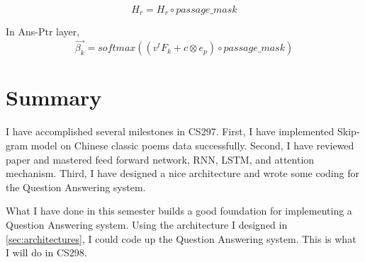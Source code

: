 \documentclass[12pt]{article}
\begin{document}
$$H_r = H_r \circ passage\_mask$$

In Ans-Ptr layer,
$$\overrightarrow{\beta _k} = softmax( (v^tF_k + c \otimes e_p) \circ passage\_mask)$$

\break

\section{Summary}\label{sec:summary}

I have accomplished several milestones in CS297. First, I have implemented Skip-gram model on Chinese classic poems data successfully. Second, I have reviewed paper \cite{wang2016machine} and mastered feed forward network, RNN, LSTM, and attention mechanism. Third, I have designed a nice architecture and wrote some coding for the Question Answering system.

What I have done in this semester builds a good foundation for implementing a Question Answering system. Using the architecture I designed in \ref{sec:architectures}, I could code up the Question Answering system. This is what I will do in CS298.

\break



\printbibliography[heading=bibintoc,title={References}]
\end{document}
